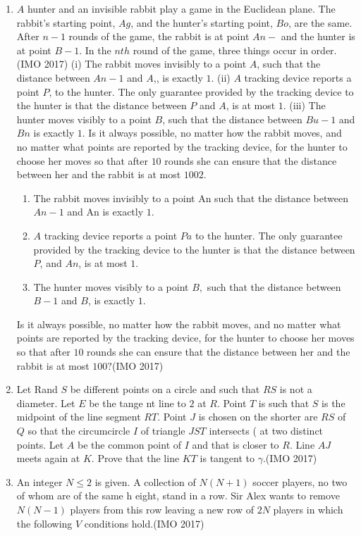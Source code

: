 \begin{enumerate}
\item $A$ hunter and an invisible rabbit play a game in the Euclidean plane. The rabbit's starting point, $Ag$, and the hunter's starting point, $Bo$, are the same. After $n-1$ rounds of the game, the rabbit is at point $An-$ and the hunter is at point $B-1$. In the $nth$ round of the game, three things occur in order.\hfill (IMO 2017)        
	(i) The rabbit moves invisibly to a point $A$, such that the distance between $An-1$ and $A$,, is exactly $1$.                    
	(ii) $A$ tracking device reports a point $P$, to the hunter. The only guarantee provided by the tracking device to the hunter is that the distance between $P$ and $A$, is at most $1$.
 (iii) The hunter moves visibly to a point $B$, such that the distance between $Bu-1$ and $Bn$ is exactly $1$. Is it always possible, no matter how the rabbit moves, and no matter what points are reported by the tracking device, for the hunter to choose her moves so that after $10$ rounds she can ensure that the distance between her and the rabbit is at most $1002.$
  \begin{enumerate}[label=(\roman*)]
  \item The rabbit moves invisibly to a point An such that the distance between $An-1$ and An is exactly $1$.
 \item $A$ tracking device reports a point $Pa$ to the hunter. The only guarantee provided by the tracking device to the hunter is that the distance between $    P$, and $An$, is at most $1$.
\item The hunter moves visibly to a point $B,$ such that the distance between $B-1$ and $B$, is exactly $1$.
 \end{enumerate}
 Is it always possible, no matter how the rabbit moves, and no matter what points are reported by the tracking device, for the hunter to choose her moves so that after $10$ rounds she can ensure that the distance between her and the rabbit is at most $100?$\hfill (IMO 2017)
\item Let Rand $S$ be different points on a circle and such that $RS$ is not a diameter. Let $E$ be the tange    nt line to $2$ at $R$. Point $T$ is such that $S$ is the midpoint of the line segment $RT$. Point $J$ is chosen on the shorter are $RS$ of $Q$ so that the circumcircle $I$ of triangle $JST$ intersects ( at two distinct points. Let $A$ be the common point of $I$ and that is closer to $R$. Line $AJ$ meets again at $K$. Prove that the line $KT$ is tangent to $\gamma$.\hfill (IMO 2017)
\item An integer $N\leq2$ is given. A collection of $N(N+1)$ soccer players, no two of whom are of the same h    eight, stand in a row. Sir Alex wants to remove $N(N-1)$ players from this row leaving a new row of $2N$ players in which the following $V$ conditions hold.\hfill (IMO 2017)                                           \begin{enumerate}[label=(\arabic *)]                

\end{enumerate}
\end{enumerate}

